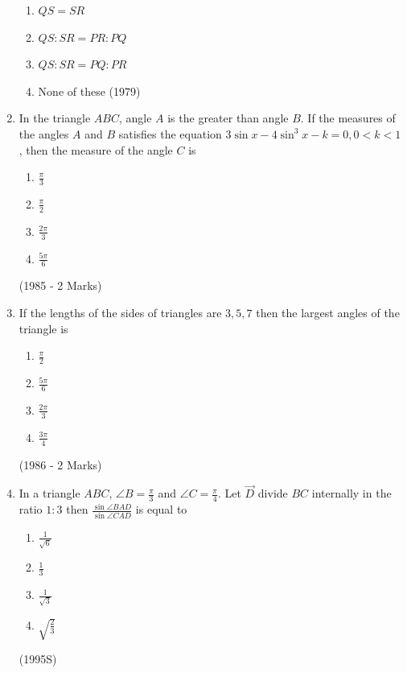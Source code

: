 \begin{enumerate}[label=\thesubsection.\arabic*,ref=\thesubsection.\theenumi]
\begin{multicols}{4}
    \begin{enumerate}
        \item $QS = SR$
        \item $QS : SR = PR : PQ$
        \item $QS : SR = PQ : PR$
        \item None of these \hfill (1979)
    \end{enumerate}
\end{multicols}
    \item In the triangle $ABC$, angle $A$ is the greater than angle $B$. If the measures of the angles $A$ and $B$ satisfies the equation $3\sin x - 4 \sin^3 x - k = 0, 0<k<1$ , then the measure of the angle $C$ is 
	    \begin{multicols}{2}
	    \begin{enumerate}
     \item $\frac{\pi}{3}$
     \item $\frac{\pi}{2}$
     \item $\frac{2\pi}{3}$
     \item $\frac{5\pi}{6}$ 
\end{enumerate}
	    \end{multicols}
		\hfill (1985 - 2 Marks)
    \item If the lengths of the sides of triangles are $3,5,7$ then the largest angles of the triangle is
	    \begin{multicols}{2}
	    \begin{enumerate}
     \item $\frac{\pi}{2}$
     \item $\frac{5\pi}{6}$
     \item $\frac{2\pi}{3}$
     \item $\frac{3\pi}{4}$ 
	    \end{enumerate}
	    \end{multicols}
		\hfill (1986 - 2 Marks)
\item In a triangle $ABC$, $\angle B = \frac{\pi}{3}$ and $\angle C = \frac{\pi}{4}$. Let $\vec{D}$ divide $BC$ internally in the ratio $1\colon3$ then $\frac{\sin\angle BAD}{\sin \angle CAD}$ is equal to
\begin{enumerate}
\item $\frac{1}{\sqrt6}$
\item $\frac{1}{3}$
\item $\frac{1}{\sqrt3}$
\item $\sqrt{\frac{2}{3}}$
\end{enumerate}
\hfill (1995S)


\end{enumerate}
